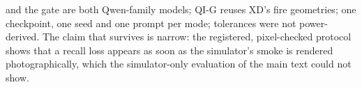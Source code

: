 and the gate are both Qwen-family models; QI-G reuses XD's fire geometries; one checkpoint, one seed and one prompt per mode; tolerances were not power-derived. The claim that survives is narrow: the registered, pixel-checked protocol shows that a recall loss appears as soon as the simulator's smoke is rendered photographically, which the simulator-only evaluation of the main text could not show.
